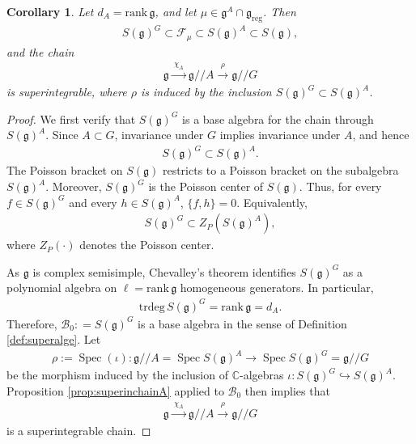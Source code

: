\documentclass[11pt,reqno]{amsart}
\newtheorem*{theorem A}{Main Theorem A}
\newtheorem*{theorem B}{Main Theorem B}
\newtheorem*{theorem C}{Main Theorem C}
\newtheorem*{theorem D}{Main Theorem D}
\theoremstyle{definition}
\theoremstyle{plain}
\newtheorem{corollary}[theorem]{Corollary}
\theoremstyle{conclusion}
\begin{document}
\begin{corollary}
\label{cor:mfspbase}
Let  $d_A = \mathrm{rank} \,\mathfrak{g}$, and let $\mu \in \mathfrak{g}^A \cap \mathfrak{g}_{\mathrm{reg}}$. Then \begin{align*}
S(\mathfrak{g})^G \subset \mathcal{F}_\mu \subset S(\mathfrak{g})^A \subset S(\mathfrak{g}),
\end{align*}
and the chain
\begin{align*}
\mathfrak{g} \xrightarrow{\ \chi_A\ } \mathfrak{g}//A \xrightarrow{\ \rho\ } \mathfrak{g}//G
\end{align*}
is superintegrable, where $\rho$ is induced by the inclusion $S(\mathfrak{g})^G \subset S(\mathfrak{g})^A$. 
\end{corollary}
 

\begin{proof}
We first verify that $S(\mathfrak{g})^G$ is a base algebra for the chain through $S(\mathfrak{g})^A$.
Since $A\subset G$, invariance under $G$ implies invariance under $A$, and hence
\begin{align*}
S(\mathfrak{g})^G\subset S(\mathfrak{g})^A.
\end{align*}
The Poisson bracket on $S(\mathfrak{g})$ restricts to a Poisson bracket on the subalgebra $S(\mathfrak{g})^A$. Moreover, $S(\mathfrak{g})^G$ is the Poisson center of $S(\mathfrak{g})$. Thus, for every $f\in S(\mathfrak{g})^G$ and every $h\in S(\mathfrak{g})^A$,  $\{f,h\}=0$. Equivalently, \begin{align*}
S(\mathfrak{g})^G \subset Z_P\!\left(S(\mathfrak{g})^A\right),
\end{align*}
where $Z_P(\cdot)$ denotes the Poisson center.

As $\mathfrak{g}$ is complex semisimple, Chevalley's theorem identifies $S(\mathfrak{g})^G$ as a polynomial algebra on $\ell = \mathrm{rank}\,\mathfrak{g}$ homogeneous generators. In particular, \begin{align*}
\mathrm{trdeg}\, S(\mathfrak{g})^G = \mathrm{rank}\,\mathfrak{g} = d_A.
\end{align*} Therefore, $ \mathcal{B}_0: =S(\mathfrak{g})^G$ is a base algebra in the sense of Definition \ref{def:superalge}. Let \begin{align*}
\rho:=\operatorname{Spec}(\iota):\mathfrak{g}//A=\operatorname{Spec}S(\mathfrak{g})^A \longrightarrow \operatorname{Spec}S(\mathfrak{g})^G=\mathfrak{g}//G
\end{align*} be the morphism induced by the inclusion of $\mathbb{C}$-algebras $\iota:S(\mathfrak{g})^G\hookrightarrow S(\mathfrak{g})^A$. Proposition \ref{prop:superinchainA} applied to $ \mathcal{B}_0$ then implies that \begin{align*}
\mathfrak{g} \xrightarrow{\ \chi_A\ } \mathfrak{g}//A \xrightarrow{\ \rho\ } \mathfrak{g}//G
\end{align*} is a superintegrable chain.


\end{proof}
\end{document}
